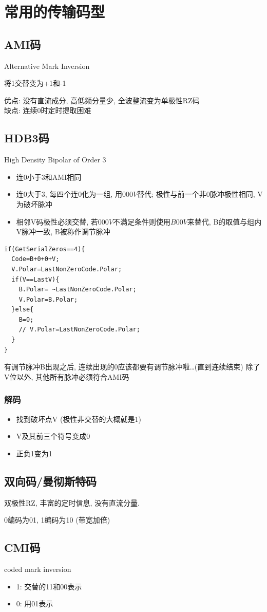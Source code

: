 \documentclass[a4paper]{report}
\begin{document}
\section{常用的传输码型}
\subsection{AMI码}
Alternative Mark Inversion

将1交替变为+1和-1

优点: 没有直流成分, 高低频分量少, 全波整流变为单极性RZ码
\\缺点: 连续0时定时提取困难
\subsection{HDB3码}
High Density Bipolar of Order 3

\begin{itemize}
  \item 连0小于3和AMI相同
  \item 连0大于3, 每四个连0化为一组, 用$000V$替代; 极性与前一个非0脉冲极性相同, V为破坏脉冲
  \item 相邻V码极性必须交替, 若$000V$不满足条件则使用$B00V$来替代, B的取值与组内V脉冲一致, B被称作调节脉冲
\end{itemize}
\begin{verbatim}
if(GetSerialZeros==4){
  Code=B+0+0+V;
  V.Polar=LastNonZeroCode.Polar;
  if(V==LastV){
    B.Polar= ~LastNonZeroCode.Polar;
    V.Polar=B.Polar;
  }else{
    B=0;
    // V.Polar=LastNonZeroCode.Polar;
  }
}
\end{verbatim}
有调节脉冲B出现之后, 连续出现的0应该都要有调节脉冲啦\dots (直到连续结束) 除了V位以外, 其他所有脉冲必须符合AMI码
\subsubsection{解码}
\begin{itemize}
  \item 找到破坏点V (极性非交替的大概就是1) 
  \item V及其前三个符号变成0
  \item 正负1变为1
\end{itemize}
\subsection{双向码/曼彻斯特码}
双极性RZ, 丰富的定时信息, 没有直流分量. 

0编码为01, 1编码为10 (带宽加倍)
\subsection{CMI码}
coded mark inversion
\begin{itemize}
  \item 1: 交替的11和00表示
  \item 0: 用01表示
\end{itemize}
\end{document}
